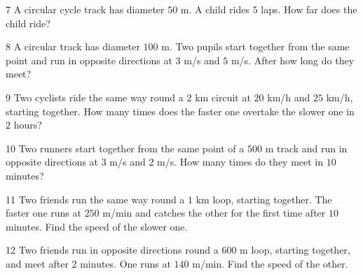 \gap
\begin{probbox}{7}{\relax}
A circular cycle track has diameter $50$ m. A child rides $5$ laps. How far does the child ride?
\end{probbox}
\gap
\begin{probbox}{8}{\relax}
A circular track has diameter $100$ m. Two pupils start together from the same point and run in opposite directions at $3$ m/s and $5$ m/s. After how long do they meet?
\end{probbox}
\gap
\begin{probbox}{9}{\relax}
Two cyclists ride the same way round a $2$ km circuit at $20$ km/h and $25$ km/h, starting together. How many times does the faster one overtake the slower one in $2$ hours?
\end{probbox}
\gap
\begin{probbox}{10}{\relax}
Two runners start together from the same point of a $500$ m track and run in opposite directions at $3$ m/s and $2$ m/s. How many times do they meet in $10$ minutes?
\end{probbox}
\gap
\begin{probbox}{11}{\relax}
Two friends run the same way round a $1$ km loop, starting together. The faster one runs at $250$ m/min and catches the other for the first time after $10$ minutes. Find the speed of the slower one.
\end{probbox}
\gap
\begin{probbox}{12}{\relax}
Two friends run in opposite directions round a $600$ m loop, starting together, and meet after $2$ minutes. One runs at $140$ m/min. Find the speed of the other.
\end{probbox}
